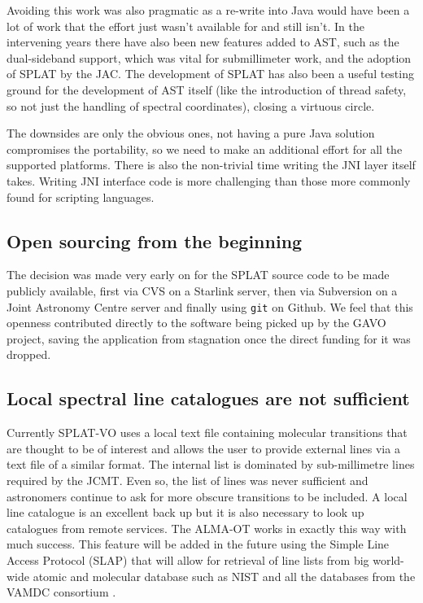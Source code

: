 \documentclass[final,authoryear,5p,times,twocolumn]{elsarticle}
\begin{document}
Avoiding this work was also pragmatic as a re-write into Java would
have been a lot of work that the effort just wasn't available for and
still isn't. In the intervening years there have also been new
features added to AST, such as the dual-sideband support, which was
vital for submillimeter work, and the adoption of SPLAT by the
JAC. The development of SPLAT has also been a useful testing ground
for the development of AST itself (like the introduction of thread
safety, so not just the handling of spectral coordinates), closing a
virtuous circle.

The downsides are only the obvious ones, not having a pure Java
solution compromises the portability, so we need to make an additional
effort for all the supported platforms. There is also the non-trivial
time writing the JNI layer itself takes. Writing JNI interface code is
more challenging than those more commonly found for scripting
languages.

\subsection{Open sourcing from the beginning}

The decision was made very early on for the SPLAT source code to be
made publicly available, first via CVS on a Starlink server, then via
Subversion on a Joint Astronomy Centre server and finally using \texttt{git}
on Github. We feel that this openness contributed directly to the
software being picked up by the GAVO project, saving the application
from stagnation once the direct funding for it was dropped.

\subsection{Local spectral line catalogues are not sufficient}

Currently SPLAT-VO uses a local text file containing molecular
transitions that are thought to be of interest and allows the user to
provide external lines via a text file of a similar format. The
internal list is dominated by sub-millimetre lines required by the
JCMT. Even so, the list of lines was never sufficient and astronomers
continue to ask for more obscure transitions to be included. A local
line catalogue is an excellent back up but it is also necessary to
look up catalogues from remote services. The ALMA-OT
\citep{2013ASPC..475..373W} works in exactly this way with much
success. This feature will be added in the future using the Simple
Line Access Protocol (SLAP) that will allow for retrieval of line
lists from big world-wide atomic and molecular database such as NIST
\citep{NIST_ASD,2012APS..DMP.D1004K,2004JPCRD..33..177L} and all the
databases from the VAMDC consortium \citep{2011BaltA..20..503K}.
\end{document}

